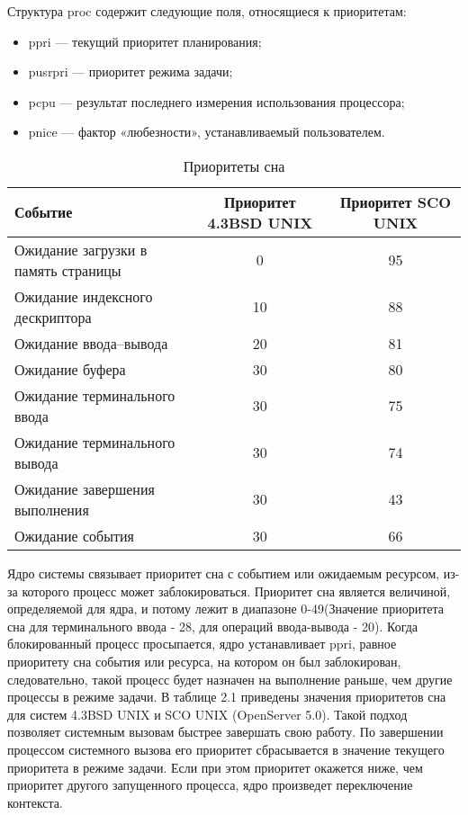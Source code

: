 \documentclass[12pt]{report}
\begin{document}
Структура proc содержит следующие поля, относящиеся к приоритетам:
\begin{itemize}
	\item p\textunderscore pri — текущий приоритет планирования;
	
	\item p\textunderscore usrpri — приоритет режима задачи;
	
	\item p\textunderscore cpu — результат последнего измерения использования процессора;
	
	\item p\textunderscore nice — фактор «любезности», устанавливаемый пользователем.
	
\end{itemize}

\begin{table}
\centering
	\begin{tabular}{|l| c | c|} 
		\hline
		Событие & Приоритет 4.3BSD UNIX & Приоритет SCO UNIX\\ [0.5ex] 
		\hline\hline
		Ожидание загрузки в память страницы & 0 & 95 \\
		\hline
		Ожидание индексного дескриптора & 10 & 88 \\
		\hline
		Ожидание ввода–вывода & 20 & 81 \\
		\hline
		Ожидание буфера & 30 & 80\\
		\hline
		Ожидание терминального ввода & 30 & 75\\
		\hline
		Ожидание терминального вывода & 30 & 74\\
		\hline
 		Ожидание завершения выполнения &30 & 43\\
 		\hline
 		Ожидание события &30 & 66\\
 		\hline
	\end{tabular}
\caption{Приоритеты сна}
\end{table}
Ядро системы связывает приоритет сна с событием или ожидаемым ресурсом, из-за которого процесс может заблокироваться. Приоритет сна является величиной, определяемой для ядра, и потому лежит в диапазоне 0-49(Значение приоритета сна для терминального ввода - 28, для операций ввода-вывода - 20). Когда блокированный процесс просыпается, ядро устанавливает p\textunderscore pri, равное приоритету сна события или ресурса, на котором он был заблокирован, следовательно, такой процесс будет назначен на выполнение раньше, чем другие процессы в режиме задачи. В таблице 2.1 приведены значения приоритетов сна для систем 4.3BSD UNIX и SCO UNIX (OpenServer 5.0). Такой подход позволяет системным вызовам быстрее завершать свою работу. По завершении процессом системного вызова его приоритет сбрасывается в значение текущего приоритета в режиме задачи. Если при этом приоритет окажется ниже, чем приоритет другого запущенного процесса, ядро произведет переключение контекста.
\end{document}
